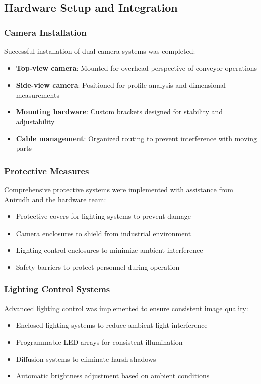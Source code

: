 \documentclass[12pt]{article}
\begin{document}
\subsection{Hardware Setup and Integration}

\subsubsection{Camera Installation}
Successful installation of dual camera systems was completed:
\begin{itemize}
\item \textbf{Top-view camera}: Mounted for overhead perspective of conveyor operations
\item \textbf{Side-view camera}: Positioned for profile analysis and dimensional measurements
\item \textbf{Mounting hardware}: Custom brackets designed for stability and adjustability
\item \textbf{Cable management}: Organized routing to prevent interference with moving parts
\end{itemize}

\subsubsection{Protective Measures}
Comprehensive protective systems were implemented with assistance from Anirudh and the hardware team:
\begin{itemize}
\item Protective covers for lighting systems to prevent damage
\item Camera enclosures to shield from industrial environment
\item Lighting control enclosures to minimize ambient interference
\item Safety barriers to protect personnel during operation
\end{itemize}

\subsubsection{Lighting Control Systems}
Advanced lighting control was implemented to ensure consistent image quality:
\begin{itemize}
\item Enclosed lighting systems to reduce ambient light interference
\item Programmable LED arrays for consistent illumination
\item Diffusion systems to eliminate harsh shadows
\item Automatic brightness adjustment based on ambient conditions
\end{itemize}
\end{document}
